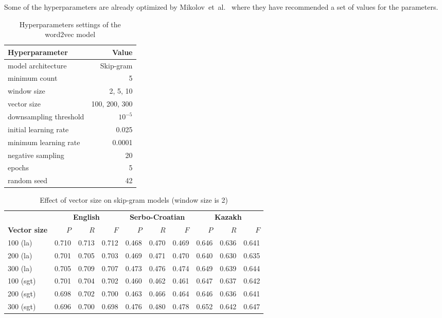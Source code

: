 \documentclass[free]{flammie}
\begin{document}
Some of the hyperparameters are already optimized by
Mikolov~et~al.~\cite{mikolov2013efficient} where they have recommended
a set of values for the parameters.

\begin{table}
\caption{Hyperparameters settings of the word2vec model}
\label{tab:word2vec-hyperparams}
\centering
\begin{tabular}{lr}
\toprule
\textbf{Hyperparameter} & \textbf{Value} \\
\midrule
model architecture & Skip-gram\\
minimum count & 5\\
window size & 2, 5, 10\\
vector size & 100, 200, 300\\
downsampling threshold & \(10^{-5}\)\\
initial learning rate & 0.025\\
minimum learning rate & 0.0001\\
negative sampling & 20\\
epochs & 5\\
random seed & 42\\
\bottomrule
\end{tabular}
\end{table}

\begin{table*}[h]
\caption{Effect of vector size on skip-gram models (window size is 2)}
\label{tab:vector}
\centering
\begin{tabular}{lrrrrrrrrr}
\toprule &\multicolumn{3}{c}{ \textbf{English}} &\multicolumn{3}{c}{ \textbf{Serbo-Croatian}} &\multicolumn{3}{c}{ \textbf{Kazakh}}\\
\textbf{Vector size} & $P$ & $R$ & $F$ & $P$ & $R$ & $F$ & $P$ & $R$ & $F$\\
\midrule
100 (la)& 0.710 & 0.713 & 0.712 & 0.468 & 0.470 & 0.469 & 0.646 & 0.636 & 0.641 \\
200 (la)& 0.701 & 0.705 & 0.703 & 0.469 & 0.471 & 0.470 & 0.640 & 0.630 & 0.635 \\
300 (la)& 0.705 & 0.709 & 0.707 & 0.473 & 0.476 & 0.474 & 0.649 & 0.639 & 0.644 \\
\midrule
100 (sgt)& 0.701 & 0.704 & 0.702 & 0.460 & 0.462 & 0.461 & 0.647 & 0.637 & 0.642 \\
200 (sgt)& 0.698 & 0.702 & 0.700 & 0.463 & 0.466 & 0.464 & 0.646 & 0.636 & 0.641 \\
300 (sgt)& 0.696 & 0.700 & 0.698 & 0.476 & 0.480 & 0.478 & 0.652 & 0.642 & 0.647 \\
\bottomrule
\end{tabular}
\end{table*}
\end{document}
